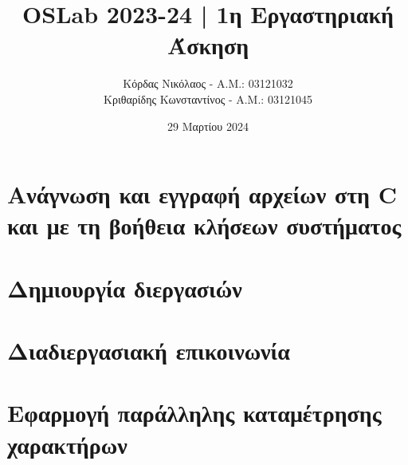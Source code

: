 \documentclass{article}
\title{OSLab 2023-24 | 1η Εργαστηριακή Άσκηση}
\author{Κόρδας Νικόλαος - Α.Μ.: 03121032 \\
        Κριθαρίδης Κωνσταντίνος - Α.Μ.: 03121045}
\date{29 Μαρτίου 2024}
\begin{document}
	\maketitle	

    \section{Ανάγνωση και εγγραφή αρχείων στη C και με τη βοήθεια κλήσεων συστήματος}

    \section{Δημιουργία διεργασιών}

    \section{Διαδιεργασιακή επικοινωνία}

    \section{Εφαρμογή παράλληλης καταμέτρησης χαρακτήρων}
\end{document}
